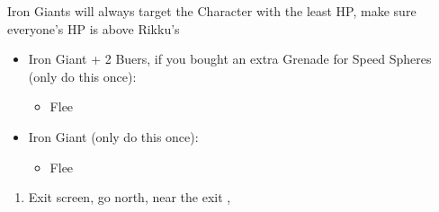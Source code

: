 \begin{encounters}
    Iron Giants will always target the Character with the least HP, make sure everyone's HP is above Rikku's
    \begin{itemize}
        \item Iron Giant + 2 Buers, if you bought an extra Grenade for Speed Spheres (only do this once):
        \begin{itemize}
            \switch{\tidus}{\rikku}
            \rikkuf Use Grenade
            \wakkaf Defend
            \auronf Defend
            \enemyf Attacks \rikku
            \switch{\wakka}{\tidus}
            \item Flee
        \end{itemize}
        \item Iron Giant (only do this once):
        \begin{itemize}
            \tidusf Defend
            \switch{\wakka}{\rikku}
            \rikkuf Steal Light Curtain
            \auronf Defend
            \enemyf Attacks \rikku
            \item Flee
        \end{itemize}
    \end{itemize}
\end{encounters}
\begin{enumerate}[resume]
    \item Exit screen, go north, near the exit \sd, \cs[3:10]
\end{enumerate}
